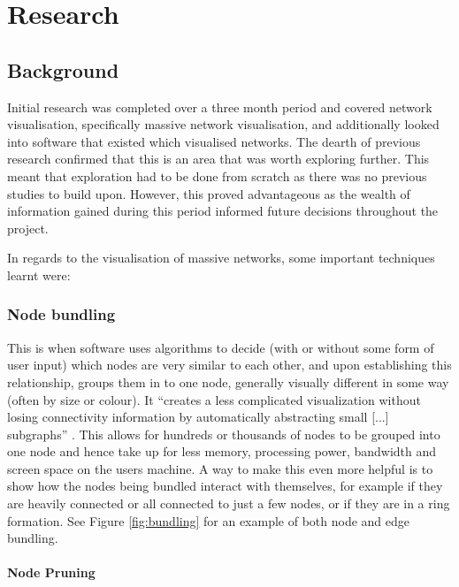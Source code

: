 \documentclass[../dissertation.tex]{subfiles}
\begin{document}
\chapter{Research}
\label{sec:research}

\section{Background}
\label{sec:background}

Initial research was completed over a three month period and covered network visualisation, specifically massive network visualisation, and additionally looked into software that existed which visualised networks. The dearth of previous research confirmed that this is an area that was worth exploring further. This meant that exploration had to be done from scratch as there was no previous studies to build upon. However, this proved advantageous as the wealth of information gained during this period informed future decisions throughout the project.

In regards to the visualisation of massive networks, some important techniques learnt were:

\subsection{Node bundling}
\label{sec:node_bundling}

This is when software uses algorithms to decide (with or without some form of user input) which nodes are very similar to each other, and upon establishing this relationship, groups them in to one node, generally visually different in some way (often by size or colour). It ``creates a less complicated visualization without losing connectivity information by automatically abstracting small [...] subgraphs'' \cite{six2003effective}. This allows for hundreds or thousands of nodes to be grouped into one node and hence take up for less memory, processing power, bandwidth and screen space on the users machine. A way to make this even more helpful is to show how the nodes being bundled interact with themselves, for example if they are heavily connected or all connected to just a few nodes, or if they are in a ring formation. See Figure \ref{fig:bundling} for an example of both node and edge bundling.

\subsubsection{Node Pruning}
\label{sec:node-pruning}
\end{document}
